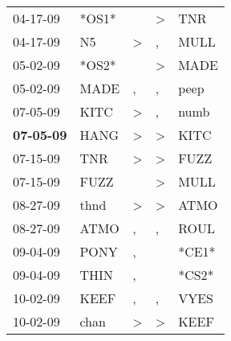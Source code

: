 \begin{supertabular}{p{0.07\textwidth}p{0.06\textwidth}p{0.02\textwidth}p{0.02\textwidth}p{0.06\textwidth}}
          04-17-09\textsuperscript{} &                            *OS1* &                  &     \textgreater &            TNR\textsuperscript{} \\
          04-17-09\textsuperscript{} &             N5\textsuperscript{} &     \textgreater &                , &           MULL\textsuperscript{} \\
          05-02-09\textsuperscript{} &                            *OS2* &                  &     \textgreater &           MADE\textsuperscript{} \\
          05-02-09\textsuperscript{} &           MADE\textsuperscript{} &                , &                , &           peep\textsuperscript{} \\
          07-05-09\textsuperscript{} &           KITC\textsuperscript{} &     \textgreater &                , &           numb\textsuperscript{} \\
 \textbf{07-05-09\textsuperscript{}} &           HANG\textsuperscript{} &     \textgreater &     \textgreater &           KITC\textsuperscript{} \\
          07-15-09\textsuperscript{} &            TNR\textsuperscript{} &     \textgreater &     \textgreater &           FUZZ\textsuperscript{} \\
          07-15-09\textsuperscript{} &           FUZZ\textsuperscript{} &                  &     \textgreater &           MULL\textsuperscript{} \\
          08-27-09\textsuperscript{} &           thnd\textsuperscript{} &     \textgreater &     \textgreater &           ATMO\textsuperscript{} \\
          08-27-09\textsuperscript{} &           ATMO\textsuperscript{} &                , &                , &           ROUL\textsuperscript{} \\
          09-04-09\textsuperscript{} &           PONY\textsuperscript{} &                , &                  &                            *CE1* \\
          09-04-09\textsuperscript{} &           THIN\textsuperscript{} &                , &                  &                            *CS2* \\
          10-02-09\textsuperscript{} &           KEEF\textsuperscript{} &                , &                , &           VYES\textsuperscript{} \\
          10-02-09\textsuperscript{} &           chan\textsuperscript{} &     \textgreater &     \textgreater &           KEEF\textsuperscript{} \\

\end{supertabular}
